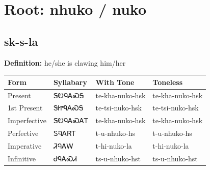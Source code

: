 \documentclass{article}%
\begin{document}
%
\normalsize%
\section*{Root: nhuko / nuko}%
\subsection*{sk-s-la}%
\textbf{Definition: }%
he/she is clawing him/her%
\\[0.5em]%
\begin{tabular}{|l|l|l|l|}%
\hline%
\textbf{Form}&\textbf{Syllabary}&\textbf{With Tone}&\textbf{Toneless}\\%
\hline%
Present&ᏕᎧᏄᎪᏍᎦ&te{-}kha{-}nuko{-}hsk&te{-}kha{-}nuko{-}hsk\\%
1st Present&ᏕᏥᏄᎪᏍᎦ&te{-}tsi{-}nuko{-}hsk&te{-}tsi{-}nuko{-}hsk\\%
Imperfective&ᏕᎧᏄᎪᏍᎪᎢ&te{-}kha{-}nuko{-}hsk&te{-}kha{-}nuko{-}hsk\\%
Perfective&ᏚᏄᎪᏒᎢ&t{-}u{-}nhuko{-}hs&t{-}u{-}nhuko{-}hs\\%
Imperative&ᏘᏄᎪᎳ&t{-}hi{-}nuko{-}la&t{-}hi{-}nuko{-}la\\%
Infinitive&ᏧᏄᎪᏍᏗ&ts{-}u{-}nhuko{-}hst&ts{-}u{-}nhuko{-}hst\\%
\hline%
\end{tabular}%
\\[1em]%
\end{document}

